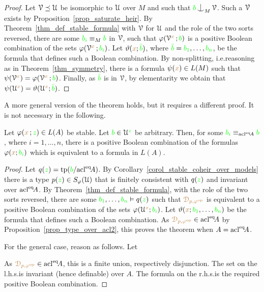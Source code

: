\begin{proof}
  Let $\EuScript V\preceq\EuScript U$ be isomorphic to $\EuScript U$ over $M$ and such that ${\gr b}\nonfork_M\V$.
  Such a $\EuScript V$ exists by Proposition~\ref{prop_saturate_heir}.
  By Theorem~\ref{thm_def_stable_formula} with $\EuScript V$ for $\EuScript U$ and the role of the two sorts reversed, there are  some  ${\color{green} b_i}\equiv_M{\color{green} b}$ in $\EuScript V$, such that $\varphi(\EuScript V^{\color{brown} x}\,;{\color{green} b})$ is a positive Boolean combination of the sets $\varphi(\EuScript V^{\color{brown} x}\,;{\color{green} b_i})$.
  Let $\vartheta({\color{brown} x};{\color{green}\bar b})$, where ${\color{green}\bar b} = {\color{green} b_1}, \dots, {\color{green} b_n}$, be the formula that defines such a Boolean combination.
  By non-splitting, i.e.\@ reasoning as in Theorem~\ref{thm_symmetry}, there is a formula $\psi({\color{brown} x})\in L(M)$ such that $\psi(\EuScript V^{\color{brown} x})=\varphi(\EuScript V^{\color{brown} x}\,;{\color{green} b})$.
  Finally, as ${\color{green}\bar b}$ is in $\EuScript V$, by elementarity we obtain that $\psi(\EuScript U^{\color{brown} x})=\vartheta(\EuScript U^{\color{brown} x};{\color{green}\bar b})$.
\end{proof}

A more general version of the theorem holds, but it requires a different proof.
It is not necessary in the following.

\begin{theorem}\label{thm_stability_definable_rovescio2}
  Let $\varphi({\color{brown} x}\,;{\color{green} z})\in L(A)$ be stable.
  Let ${\color{green} b}\in\EuScript U^{\color{green} z}$ be arbitrary.
  Then, for some ${\color{green} b_i}\equiv_{{\rm acl}^{{\rm eq}}\!A}{\color{green} b}$, where $i=1,\dots,n$, there is a positive Boolean combination of the formulas $\varphi({\color{brown} x};{\color{green} b_i})$ which is equivalent to a formula in $L(A)$.
\end{theorem}

\begin{proof}
  Let $q({\color{green} z})={\rm tp}({\color{green} b}/{\rm acl}^{{\rm eq}}\!A)$.
  By Corollary~\ref{corol_stable_coheir_over_models} there is a type $p({\color{green} z})\in S_\varphi(\EuScript U)$ that is finitely consistent with $q({\color{green} z})$ and invariant over ${\rm acl}^{{\rm eq}}\!A$.
  By Theorem~\ref{thm_def_stable_formula}, with the role of the two sorts reversed, there are some ${\color{green} b_1},\dots,{\color{green} b_n}\vDash q({\color{green} z})$ such that ${\color{brown}\EuScript D_{p,\varphi^{\rm op}}}$ is equivalent to a positive Boolean combination of the sets $\varphi(\EuScript U^{\color{brown} x};{\color{green} b_i})$.
  Let $\vartheta({\color{brown} x};{\color{green} b_1},\dots,{\color{green} b_n})$ be the formula that defines such a Boolean combination.
  As ${\color{brown}\EuScript D_{p,\varphi^{\rm op}}}\in{\rm acl}^{{\rm eq}}\!A$ by Proposition~\ref{prop_type_over_acl2}, this proves the theorem when $A={\rm acl}^{{\rm eq}}\!A$.

  For the general case, reason as follows.
  Let 
  

  As ${\color{brown}\EuScript D_{p,\varphi^{\rm op}}}\in{\rm acl}^{{\rm eq}}\!A$, this is a finite union, respectively disjunction.
  The set on the l.h.s.\@ is invariant (hence definable) over $A$.
  The formula on the r.h.s.\@ is the required positive Boolean combination.
\end{proof}

